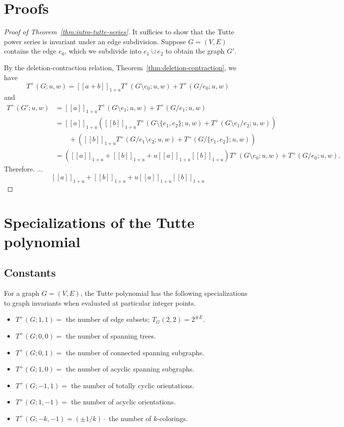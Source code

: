 \documentclass{amsart}
\theoremstyle{definition}
\newcommand{\fanalog}[2]{[\![#2]\!]_{#1}}
\begin{document}
\section{Proofs}

\begin{proof}[Proof of Theorem~\ref{thm:intro-tutte-series}]
It sufficies to show that the Tutte power series is invariant 
under an edge subdivision.
Suppose $G = (V,E)$ contains the edge $e_0$, which we subdivide into $e_1 \cup e_2$ to obtain the graph $G'$.

By the deletion-contraction relation, Theorem~\ref{thm:deletion-contraction},
we have
\[
	T^+(G; u,w) = \fanalog{1 + u}{a + b} T^+(G\setminus e_0; u,w) + T^+(G/e_0; u,w)
\]
and 
\begin{align*}
	T^+(G'; u,w) &= \fanalog{1 + u}{a} T^+(G\setminus e_1; u,w) + T^+(G/e_1; u,w)\\
	&= \fanalog{1 + u}{a}\left(\fanalog{1 + u}{b} T^+(G\setminus\{e_1,e_2\}; u,w) + T^+(G \setminus e_1 / e_2; u,w)\right) \\
	&\qquad + \left(\fanalog{1 + u}{b} T^+(G/e_1 \setminus e_2; u,w) + T^+(G/\{e_1,e_2\}; u,w) \right)\\
	&= (\fanalog{1 + u}{a} + \fanalog{1 + u}{b} + u\fanalog{1 + u}{a}\fanalog{1 + u}{b}) T^+(G\setminus e_0; u,w) + T^+(G/e_0; u,w) .
\end{align*}
Therefore. ... 
\[
\fanalog{1 + u}{a} + \fanalog{1 + u}{b} + u \fanalog{1 + u}{a} \fanalog{1 + u}{b}
\]
\end{proof}

\section{Specializations of the Tutte polynomial}

\subsection{Constants}
For a graph $G = (V,E)$, the Tutte polynomial has the following specializations to graph invariants when evaluated at particular integer points.

\begin{itemize}
\item 
$T^+(G;1,1)=$  the number of edge subsets;
$T_G(2,2) = 2^{\# E}$.

\item 
$T^+(G;0,0) =$ the number of spanning trees.

\item 
$T^+(G;0,1) =$ the number of connected spanning subgraphs.

\item 
$T^+(G;1,0) =$ the number of acyclic spanning subgraphs.

\item 
$T^+(G;-1,1) =$ the number of totally cyclic orientations.

\item 
$T^+(G;1,-1) =$ the number of acyclic orientations.

\item 
$T^+(G; -k, -1) = (\pm 1/k)\cdot$ the number of $k$-colorings.
\end{itemize}
\end{document}
